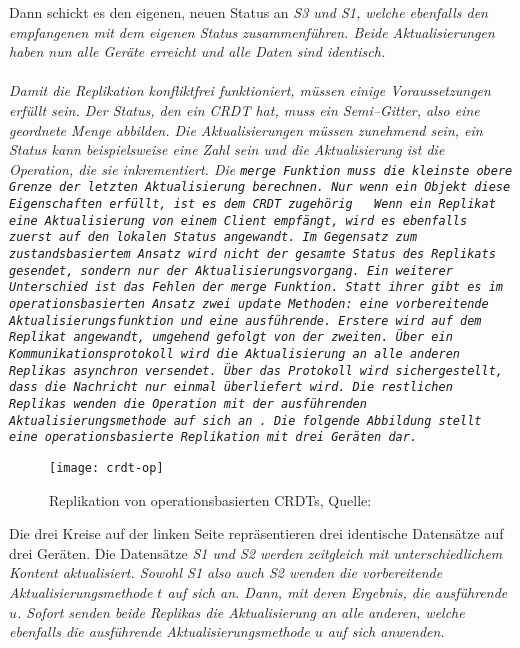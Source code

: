 Dann schickt es den eigenen, neuen Status an \it{S3} und \it{S1}, welche ebenfalls den empfangenen mit dem eigenen Status zusammenführen. Beide Aktualisierungen haben nun alle Geräte erreicht und alle Daten sind identisch.\\\\
%
Damit die Replikation konfliktfrei funktioniert, müssen einige Voraussetzungen erfüllt sein.
Der Status, den ein \gls{CRDT} hat, muss ein Semi--Gitter, also eine geordnete Menge abbilden.
Die Aktualisierungen müssen zunehmend sein, ein Status kann beispielsweise eine Zahl sein und die Aktualisierung ist die Operation, die sie inkrementiert.
Die \tt{merge} Funktion muss die kleinste obere Grenze der letzten Aktualisierung berechnen.
Nur wenn ein Objekt diese Eigenschaften erfüllt, ist es dem \gls{CRDT} zugehörig ~\cite{crdt_shapiro2}
%
%
%
Wenn ein Replikat eine Aktualisierung von einem Client empfängt, wird es ebenfalls zuerst auf den lokalen Status angewandt.
Im Gegensatz zum zustandsbasiertem Ansatz wird nicht der gesamte Status des Replikats gesendet, sondern nur der Aktualisierungsvorgang.
Ein weiterer Unterschied ist das Fehlen der \tt{merge} Funktion. Statt ihrer gibt es im operationsbasierten Ansatz zwei \tt{update} Methoden: eine vorbereitende Aktualisierungsfunktion und eine ausführende. Erstere wird auf dem Replikat angewandt, umgehend gefolgt von der zweiten.
Über ein Kommunikationsprotokoll wird die Aktualisierung an alle anderen Replikas asynchron versendet.
Über das Protokoll wird sichergestellt, dass die Nachricht nur einmal überliefert wird.
Die restlichen Replikas wenden die Operation mit der ausführenden Aktualisierungsmethode auf sich an~\cite{crdt_shapiro2}.
Die folgende Abbildung stellt eine operationsbasierte Replikation mit drei Geräten dar.
%
\begin{figure}[H]
  \centering
  \texttt{[image: crdt-op]}
  \grayRule
  \caption[Replikation von operationsbasierten \gls{CRDT}]{Replikation von operationsbasierten \glspl{CRDT}, Quelle: ~\cite{crdt_shapiro2}}
  \label{fig:crdt-op}
\end{figure}
%
Die drei Kreise auf der linken Seite repräsentieren drei identische Datensätze auf drei Geräten.
Die Datensätze \it{S1} und \it{S2} werden zeitgleich mit unterschiedlichem Kontent aktualisiert.
Sowohl \it{S1} also auch \it{S2} wenden die vorbereitende Aktualisierungsmethode $t$ auf sich an.
Dann, mit deren Ergebnis, die ausführende $u$.
Sofort senden beide Replikas die Aktualisierung an alle anderen, welche ebenfalls die ausführende Aktualisierungsmethode $u$ auf sich anwenden.\\\\
